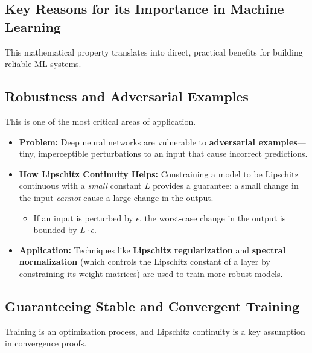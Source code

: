 \begin{notechapter}
\section{Key Reasons for its Importance in Machine Learning}

This mathematical property translates into direct, practical benefits for building reliable ML systems.

\subsection{Robustness and Adversarial Examples}

This is one of the most critical areas of application.

\begin{itemize}
    \item \textbf{Problem:} Deep neural networks are vulnerable to \textbf{adversarial examples}---tiny, imperceptible perturbations to an input that cause incorrect predictions.
    \item \textbf{How Lipschitz Continuity Helps:} Constraining a model to be Lipschitz continuous with a \textit{small} constant \( L \) provides a guarantee: a small change in the input \textit{cannot} cause a large change in the output.
    \begin{itemize}
        \item If an input is perturbed by \( \epsilon \), the worst-case change in the output is bounded by \( L \cdot \epsilon \).
    \end{itemize}
    \item \textbf{Application:} Techniques like \textbf{Lipschitz regularization} and \textbf{spectral normalization} (which controls the Lipschitz constant of a layer by constraining its weight matrices) are used to train more robust models.
\end{itemize}

\subsection{Guaranteeing Stable and Convergent Training}

Training is an optimization process, and Lipschitz continuity is a key assumption in convergence proofs.


\end{notechapter}
